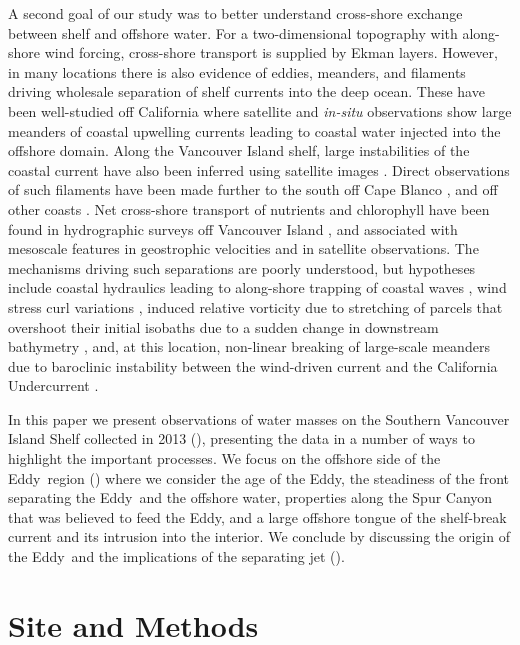 \documentclass[draft]{agujournal2019}
\newcommand*{\Eddy}{{\sc Eddy}}
\begin{document}
A second goal of our study was to better understand cross-shore exchange between shelf and offshore water.  For a two-dimensional topography with along-shore wind forcing, cross-shore transport is supplied by Ekman layers. However, in many locations there is also evidence of eddies, meanders, and filaments driving wholesale separation of shelf currents into the deep ocean. These have been well-studied off California \cite{strubetal91} where satellite and \emph{in-situ} observations show large meanders of coastal upwelling currents leading to coastal water injected into the offshore domain.   Along the Vancouver Island shelf, large instabilities of the coastal current have also been inferred using satellite images \cite{ikedaemery84,thomsongower98}.  Direct observations of such filaments have been made further to the south off Cape Blanco \cite{barthetal00}, and off other coasts \cite{relvasbarton05}. Net cross-shore transport of nutrients and chlorophyll have been found in hydrographic surveys off Vancouver Island \cite{mackasyelland99}, and associated with mesoscale features in geostrophic velocities and in satellite observations.  The mechanisms driving such separations are poorly understood, but hypotheses include coastal hydraulics leading to along-shore trapping of coastal waves \cite{dalebarth01},  wind stress curl variations \cite{castelaobarth07}, induced relative vorticity due to stretching of parcels that overshoot their initial isobaths due to a sudden change in downstream bathymetry \cite{dasaro88}, and, at this location, non-linear breaking of large-scale meanders due to baroclinic instability between the wind-driven current and the California Undercurrent \cite{ikedaetal84, batteen97}.

In this paper we present observations of water masses on the Southern Vancouver Island Shelf collected in 2013 (), presenting the data in a number of ways to highlight the important processes.  We focus on the offshore side of the \Eddy\ region () where we consider the age of the \Eddy, the steadiness of the front separating the \Eddy\ and the offshore water, properties along the Spur Canyon that was believed to feed the \Eddy, and a large offshore tongue of the shelf-break current and its intrusion into the interior.  We conclude by discussing the origin of the \Eddy\ and the implications of the separating jet ().

\section{Site and Methods}
\label{sec:Site}
\end{document}
